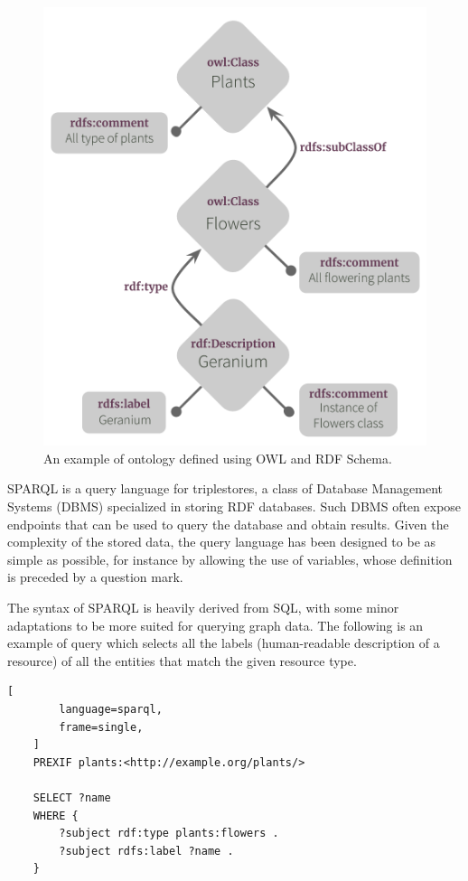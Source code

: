 \documentclass[%
    corpo=13.5pt,
    twoside,
    oldstyle,
    tipotesi=magistrale,
    greek,
    evenboxes
]{toptesi}
\begin{document}
\begin{figure}[ht]
\centering
\includegraphics[scale=0.6]{img/owl-ontology-example.png}
\caption{An example of ontology defined using OWL and RDF Schema.}
\label{fig:owl-ontology-example}
\end{figure}

SPARQL is a query language for triplestores, a class of Database
Management Systems (DBMS) specialized in storing RDF databases. Such DBMS
often expose endpoints that can be used to query the database and obtain
results. Given the complexity of the stored data, the query language has
been designed to be as simple as possible, for instance by allowing the use
of variables, whose definition is preceded by a question mark.

The syntax of SPARQL is heavily derived from SQL, with some
minor adaptations to be more suited for querying graph data. The
following is an example of query which selects all the labels
(human-readable description of a resource) of all the entities that
match the given resource type.

\begin{lstlisting}[
        language=sparql,
        frame=single,
    ]
    PREXIF plants:<http://example.org/plants/>

    SELECT ?name
    WHERE {
        ?subject rdf:type plants:flowers .
        ?subject rdfs:label ?name .
    }
\end{lstlisting}
\end{document}
